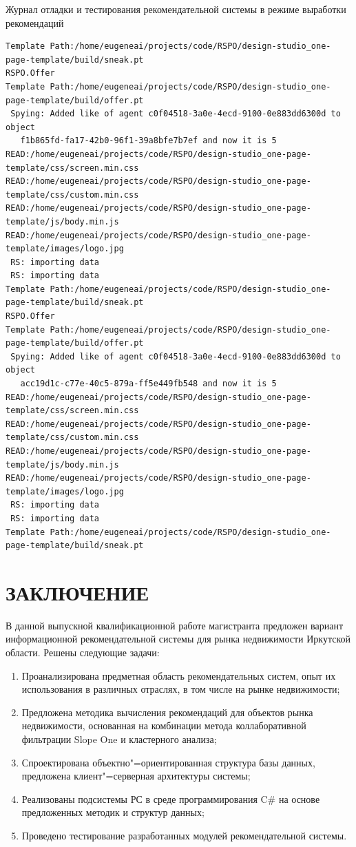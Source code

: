 \documentclass[a4paper,14pt,openany,final]{extreport} %
\begin{document}
{\begin{pzlisting}
  \caption{Журнал отладки и тестирования рекомендательной системы в режиме выработки рекомендаций}\label{lst:log}
\begin{verbatim}
Template Path:/home/eugeneai/projects/code/RSPO/design-studio_one-page-template/build/sneak.pt
RSPO.Offer
Template Path:/home/eugeneai/projects/code/RSPO/design-studio_one-page-template/build/offer.pt
 Spying: Added like of agent c0f04518-3a0e-4ecd-9100-0e883dd6300d to object
   f1b865fd-fa17-42b0-96f1-39a8bfe7b7ef and now it is 5
READ:/home/eugeneai/projects/code/RSPO/design-studio_one-page-template/css/screen.min.css
READ:/home/eugeneai/projects/code/RSPO/design-studio_one-page-template/css/custom.min.css
READ:/home/eugeneai/projects/code/RSPO/design-studio_one-page-template/js/body.min.js
READ:/home/eugeneai/projects/code/RSPO/design-studio_one-page-template/images/logo.jpg
 RS: importing data
 RS: importing data
Template Path:/home/eugeneai/projects/code/RSPO/design-studio_one-page-template/build/sneak.pt
RSPO.Offer
Template Path:/home/eugeneai/projects/code/RSPO/design-studio_one-page-template/build/offer.pt
 Spying: Added like of agent c0f04518-3a0e-4ecd-9100-0e883dd6300d to object
   acc19d1c-c77e-40c5-879a-ff5e449fb548 and now it is 5
READ:/home/eugeneai/projects/code/RSPO/design-studio_one-page-template/css/screen.min.css
READ:/home/eugeneai/projects/code/RSPO/design-studio_one-page-template/css/custom.min.css
READ:/home/eugeneai/projects/code/RSPO/design-studio_one-page-template/js/body.min.js
READ:/home/eugeneai/projects/code/RSPO/design-studio_one-page-template/images/logo.jpg
 RS: importing data
 RS: importing data
Template Path:/home/eugeneai/projects/code/RSPO/design-studio_one-page-template/build/sneak.pt
\end{verbatim}
\end{pzlisting}

\chapter*{ЗАКЛЮЧЕНИЕ}
В данной выпускной квалификационной работе магистранта предложен вариант информационной рекомендательной системы для рынка недвижимости Иркутской области. Решены следующие задачи:
\begin{enumerate}
\item Проанализирована предметная область рекомендательных систем, опыт их использования в различных отраслях, в том числе на рынке недвижимости;
\item Предложена методика вычисления рекомендаций для объектов рынка недвижимости, основанная на комбинации метода коллаборативной фильтрации \foreignlanguage{english}{Slope One} и кластерного анализа;
\item Спроектирована объектно"=ориентированная структура базы данных, предложена клиент"=серверная архитектуры системы;
\item Реализованы подсистемы РС в среде программирования C\# на основе предложенных методик и структур данных;
\item Проведено тестирование разработанных модулей рекомендательной системы.
\end{enumerate}

}
\end{document}
